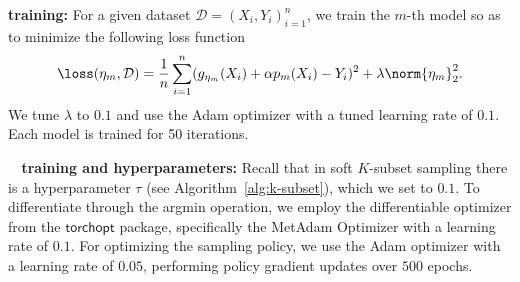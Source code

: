 \noindent\textbf{\ensembleplus training:} For a given dataset ${\mathcal D} =(X_i,Y_i)_{i=1}^n$, we train the $m$-th model so as to minimize the following loss function 
\begin{align*}
    \loss(\eta_m, \mathcal D) =  \frac{1}{n}\sum_{i=1}^n (g_{\eta_m}(X_i) + \alpha p_m(X_i)-Y_i)^2 + \lambda \norm{\eta_m}_2^2.
\end{align*}
We tune $\lambda$ to $0.1$ and use the Adam optimizer with a tuned learning rate of $0.1$. Each model is trained for 50 iterations.



 
\noindent\textbf{\ouralgo  ~ training and hyperparameters:} Recall that in soft $K$-subset sampling there is a hyperparameter $\tau$  (see Algorithm~\ref{alg:k-subset}), which we set to $0.1$. To differentiate through the argmin operation, we employ the differentiable optimizer from the $\mathsf{torchopt}$ package, specifically the MetAdam Optimizer with a learning rate of $0.1$. For optimizing the sampling policy, we use the Adam optimizer with a learning rate of $0.05$, performing policy gradient updates over $500$ epochs. 















